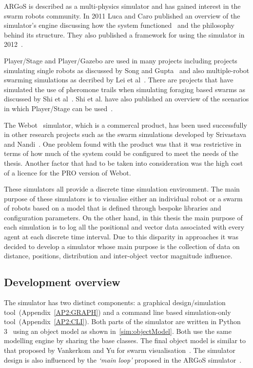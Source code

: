 ARGoS is described as a multi-physics simulator and has gained interest in the swarm robots community. In 2011 Luca and Caro published an overview of the simulator's engine discussing how the system functioned~\cite{PTOPB:11} and the philosophy behind its structure. They also published a framework for using the simulator in 2012~\cite{KCGD:12}. 

Player/Stage and Player/Gazebo are used in many projects including projects simulating single robots as discussed by Song and Gupta~\cite{SG:15} and also multiple-robot swarming simulations as decribed by Lei et al~\cite{LLZ:08}. There are projects that have simulated the use of pheromone trails when simulating foraging based swarms as discussed by Shi et al~\cite{STZZW:13}. Shi et al. have also published an overview of the scenarios in which Player/Stage can be used~\cite{STWZZ:11}.

The Webot~\cite{CL:16} simulator, which is a commercal product, has been used successfully in other research projects such as the swarm simulations developed by Srivastava and Nandi~\cite{SN:10}. One problem found with the product was that it was restrictive in terms of how much of the system could be configured to meet the needs of the thesis. Another factor that had to be taken into consideration was the high cost of a licence for the PRO version of Webot.

These simulators all provide a discrete time simulation environment. The main purpose of these simulators is to visualise either an individual robot or a swarm of robots based on a model that is defined through bespoke libraries and configuration parameters. On the other hand, in this thesis the main purpose of each simulation is to log all the positional and vector data associated with every agent at each discrete time interval. Due to this disparity in approaches it was decided to develop a simulator whose main purpose is the collection of data on distance, positions, distribution and inter-object vector magnitude influence. 

\subsection{Development overview}\label{sim:intro}
The simulator has two distinct components: a graphical design/simulation tool~(Appendix~\ref{AP2:GRAPH}) and a command line based simulation-only tool~(Appendix~\ref{AP2:CLI}). Both parts of the simulator are written in Python 3~\cite{PYTHON3:15} using an object model as shown in~\autoref{sim:objectModel}. Both use the same modelling engine by sharing the base classes.  The final object model is similar to that proposed by Vankerkom and Yu for swarm visualisation~\cite{VY:04}. The simulator design is also influenced by the \textit{`main loop'} proposed in the ARGoS simulator~\cite{PTOPB:11}.

